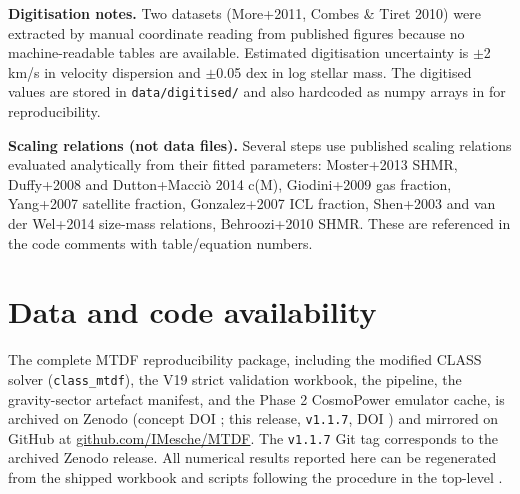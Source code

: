 \documentclass[11pt,a4paper]{article}
\begin{document}
\textbf{Digitisation notes.} Two datasets (More+2011, Combes \& Tiret 2010) were extracted by manual coordinate reading from published figures because no machine-readable tables are available. Estimated digitisation uncertainty is $\pm$2 km/\allowbreak{}s in velocity dispersion and $\pm$0.05 dex in log stellar mass. The digitised values are stored in \texttt{data/\allowbreak{}digitised/\allowbreak{}} and also hardcoded as numpy arrays in \texttt{{\small\protect{}}} for reproducibility.

\textbf{Scaling relations (not data files).} Several steps use published scaling relations evaluated analytically from their fitted parameters: Moster+2013 SHMR, Duffy+2008 and Dutton+Macci\`o 2014 c(M), Giodini+2009 gas fraction, Yang+2007 satellite fraction, Gonzalez+2007 ICL fraction, Shen+2003 and van der Wel+2014 size-mass relations, Behroozi+2010 SHMR. These are referenced in the code comments with table/\allowbreak{}equation numbers.

\section{Data and code availability}
The complete MTDF reproducibility package, including the modified CLASS solver
(\texttt{class\_\allowbreak{}mtdf}), the V19 strict validation workbook, the
\texttt{{\small\protect{}}} pipeline, the gravity-sector artefact manifest,
and the Phase 2 CosmoPower emulator cache, is archived on Zenodo
(concept DOI \href{https://doi.org/10.5281/zenodo.19741058}{{\small\protect{}}};
this release, \texttt{v1.1.7}, DOI
\href{https://doi.org/10.5281/zenodo.21525855}{{\small\protect{}}})
and mirrored on GitHub at
\href{https://github.com/IMesche/MTDF}{github.com/\allowbreak{}IMesche/\allowbreak{}MTDF}.
The \texttt{v1.1.7} Git tag corresponds to the archived Zenodo release. All
numerical results reported here can be regenerated from the shipped workbook
and scripts following the procedure in the top-level \texttt{{\small\protect{}}}.
\end{document}
